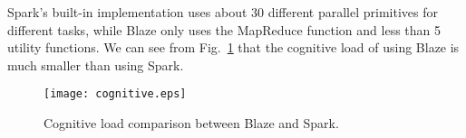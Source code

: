 Spark's built-in implementation uses about 30 different parallel primitives for different tasks, while Blaze only uses the MapReduce function and less than 5 utility functions.
We can see from Fig.~\ref{fig:cog} that the cognitive load of using Blaze is much smaller than using Spark.

\begin{figure}
  \begin{center}
  \texttt{[image: cognitive.eps]}
  \end{center}
  \vspace{-0.5cm}
  \caption{Cognitive load comparison between Blaze and Spark.}
  \label{fig:cog}
\end{figure}